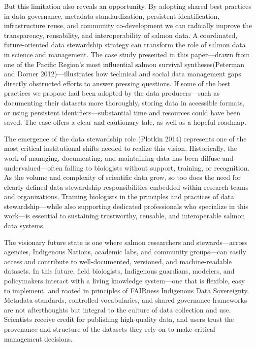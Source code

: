 \documentclass[
  letterpaper,
  DIV=11,
  numbers=noendperiod]{scrartcl}
\begin{document}
But this limitation also reveals an opportunity. By adopting shared best
practices in data governance, metadata standardization, persistent
identification, infrastructure reuse, and community co-development we
can radically improve the transparency, reusability, and
interoperability of salmon data. A coordinated, future-oriented data
stewardship strategy can transform the role of salmon data in science
and management. The case study presented in this paper---drawn from one
of the Pacific Region's most influential salmon survival
syntheses(Peterman and Dorner 2012)---illustrates how technical and
social data management gaps directly obstructed efforts to answer
pressing questions. If some of the best practices we propose had been
adopted by the data producers---such as documenting their datasets more
thoroughly, storing data in accessible formats, or using persistent
identifiers---substantial time and resources could have been saved. The
case offers a clear and cautionary tale, as well as a hopeful roadmap.

The emergence of the data stewardship role (Plotkin 2014) represents one
of the most critical institutional shifts needed to realize this vision.
Historically, the work of managing, documenting, and maintaining data
has been diffuse and undervalued---often falling to biologists without
support, training, or recognition. As the volume and complexity of
scientific data grow, so too does the need for clearly defined data
stewardship responsibilities embedded within research teams and
organizations. Training biologists in the principles and practices of
data stewardship---while also supporting dedicated professionals who
specialize in this work---is essential to sustaining trustworthy,
reusable, and interoperable salmon data systems.

The visionary future state is one where salmon researchers and
stewards---across agencies, Indigenous Nations, academic labs, and
community groups---can easily access and contribute to well-documented,
versioned, and machine-readable datasets. In this future, field
biologists, Indigenous guardians, modelers, and policymakers interact
with a living knowledge system---one that is flexible, easy to
implement, and rooted in principles of FAIRness Indigenous Data
Sovereignty. Metadata standards, controlled vocabularies, and shared
governance frameworks are not afterthoughts but integral to the culture
of data collection and use. Scientists receive credit for publishing
high-quality data, and users trust the provenance and structure of the
datasets they rely on to make critical management decisions.
\end{document}
